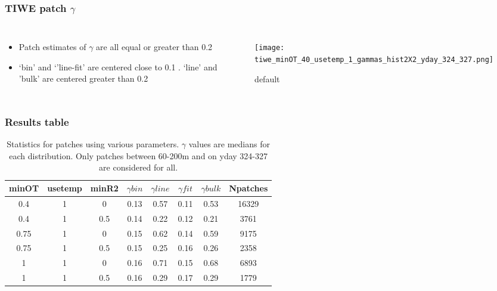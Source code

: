 \documentclass{beamer}
\begin{document}
\begin{frame}
 \frametitle{TIWE patch $\gamma$}

\begin{columns}
\begin{itemize}
\item Patch estimates of $\gamma$ are all equal or greater than 0.2
\item `bin' and `'line-fit' are centered close to 0.1 . `line' and 'bulk' are centered greater than 0.2
\end{itemize}

\begin{figure}[htbp]
\begin{center}
\texttt{[image: tiwe\_minOT\_40\_usetemp\_1\_gammas\_hist2X2\_yday\_324\_327.png]}
\caption{default}
\label{default}
\end{center}
\end{figure}

\end{columns}


\end{frame}





\begin{frame}
 \frametitle{Results table}


\begin{table}[htdp]
\caption{Statistics for patches using various parameters. $\gamma$ values are medians for each distribution. Only patches between 60-200m and on yday 324-327 are considered for all.}
\begin{center}
\begin{tabular}{|c|c|c|c|c|c|c|c|}
\hline
minOT & usetemp & minR2 & $\gamma bin$ & $\gamma line$ & $\gamma fit$ & $\gamma bulk$ & Npatches \\
\hline
0.4 & 1 & 0 & 0.13 & 0.57 & 0.11 & 0.53 & 16329 \\
\hline
0.4 & 1 & 0.5 & 0.14 & 0.22 & 0.12 & 0.21 & 3761 \\
\hline
0.75 & 1 & 0 & 0.15 & 0.62 & 0.14 & 0.59 & 9175 \\
\hline
0.75 & 1 & 0.5 & 0.15 & 0.25 & 0.16 & 0.26 & 2358 \\
\hline
1 & 1 & 0 & 0.16 & 0.71 & 0.15 & 0.68 & 6893 \\
\hline
1 & 1 & 0.5 & 0.16 & 0.29 & 0.17 & 0.29 & 1779 \\
\hline
\hline
\hline
\end{tabular}
\end{center}
\label{tab}
\end{table}%


\end{frame}
\end{document}
